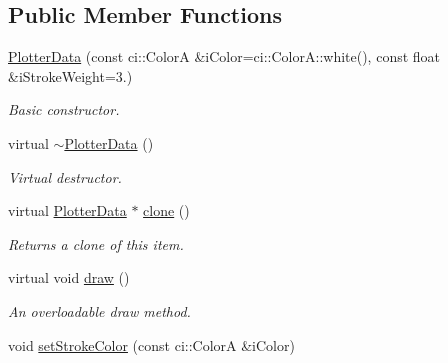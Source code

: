 \subsection*{Public Member Functions}
\begin{DoxyCompactItemize}
\item 
\hypertarget{class_plotter_data_a28cb319f221a9d910d3b589b3e9ed39c}{\hyperlink{class_plotter_data_a28cb319f221a9d910d3b589b3e9ed39c}{Plotter\-Data} (const ci\-::\-Color\-A \&i\-Color=ci\-::\-Color\-A\-::white(), const float \&i\-Stroke\-Weight=3.)}\label{class_plotter_data_a28cb319f221a9d910d3b589b3e9ed39c}

\begin{DoxyCompactList}\small\item\em Basic constructor. \end{DoxyCompactList}\item 
\hypertarget{class_plotter_data_aa0843071635bab709d414e1c33896f82}{virtual \hyperlink{class_plotter_data_aa0843071635bab709d414e1c33896f82}{$\sim$\-Plotter\-Data} ()}\label{class_plotter_data_aa0843071635bab709d414e1c33896f82}

\begin{DoxyCompactList}\small\item\em Virtual destructor. \end{DoxyCompactList}\item 
\hypertarget{class_plotter_data_a00d9c9a8a11688d545b7f1457ce52191}{virtual \hyperlink{class_plotter_data}{Plotter\-Data} $\ast$ \hyperlink{class_plotter_data_a00d9c9a8a11688d545b7f1457ce52191}{clone} ()}\label{class_plotter_data_a00d9c9a8a11688d545b7f1457ce52191}

\begin{DoxyCompactList}\small\item\em Returns a clone of this item. \end{DoxyCompactList}\item 
\hypertarget{class_plotter_data_aa6970736c980752a277d80a27481cb4f}{virtual void \hyperlink{class_plotter_data_aa6970736c980752a277d80a27481cb4f}{draw} ()}\label{class_plotter_data_aa6970736c980752a277d80a27481cb4f}

\begin{DoxyCompactList}\small\item\em An overloadable draw method. \end{DoxyCompactList}\item 
\hypertarget{class_plotter_data_a3c424fcea7e761a4fe0d91975ebf6fae}{void \hyperlink{class_plotter_data_a3c424fcea7e761a4fe0d91975ebf6fae}{set\-Stroke\-Color} (const ci\-::\-Color\-A \&i\-Color)}\label{class_plotter_data_a3c424fcea7e761a4fe0d91975ebf6fae}


\end{DoxyCompactItemize}
